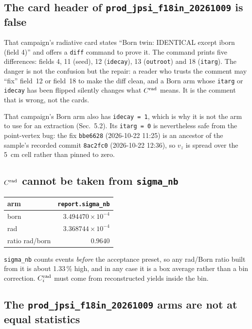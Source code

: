 \documentclass[11pt]{article}
\newcommand{\crad}{C^{\rm rad}}
\begin{document}
\subsection{The card header of \texttt{prod\_jpsi\_f18in\_20261009} is false}

That campaign's radiative card states ``Born twin: IDENTICAL except iborn (field 4)'' and offers a
\texttt{diff} command to prove it. The command prints five differences: fields 4, 11 (seed), 12
(\texttt{idecay}), 13 (\texttt{outroot}) and 18 (\texttt{itarg}). The danger is not the confusion
but the repair: a reader who trusts the comment may ``fix'' field~12 or field~18 to make the diff
clean, and a Born arm whose \texttt{itarg} or \texttt{idecay} has been flipped silently changes what
$\crad$ means. It is the comment that is wrong, not the cards.

That campaign's Born arm also has \texttt{idecay = 1}, which is why it is not the arm to use for an
extraction (Sec.~5.2). Its \texttt{itarg = 0} is nevertheless safe from the point-vertex bug: the
fix \texttt{bbe6628} (2026-10-22 11:25) is an ancestor of the sample's recorded commit
\texttt{8ac2fc0} (2026-10-22 12:36), so $v_z$ is spread over the 5~cm cell rather than pinned to
zero.

\subsection{$\crad$ cannot be taken from \texttt{sigma\_nb}}

\begin{center}
\begin{tabular}{lr}
\toprule
arm & \texttt{report.sigma\_nb} \\
\midrule
born & $3.494470\times10^{-4}$ \\
rad  & $3.368744\times10^{-4}$ \\
\midrule
ratio rad/born & $0.9640$ \\
\bottomrule
\end{tabular}
\end{center}
\texttt{sigma\_nb} counts events \emph{before} the acceptance preset, so any rad/Born ratio built
from it is about 1.33\,\% high, and in any case it is a box average rather than a bin correction.
$\crad_i$ must come from reconstructed yields inside the bin.

\subsection{The \texttt{prod\_jpsi\_f18in\_20261009} arms are not at equal statistics}
\end{document}
